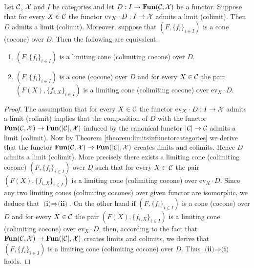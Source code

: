 \begin{corollary}\label{corollary:limitsaretakenpointwiseinfuncorcategories}
Let ${\mathcal C}$, ${\mathcal X}$ and $I$ be categories and let $D:I\rightarrow \mathbf{Fun}({\mathcal C},{\mathcal X})$ be a functor. Suppose that for every $X\in {\mathcal C}$ the functor $\mathrm{ev}_X\cdot D:I\rightarrow {\mathcal X}$ admits a limit (colimit). Then $D$ admits a limit (colimit). Moreover, suppose that $\left(F,\big\{f_i\big\}_{i\in I}\right)$ is a cone (cocone) over $D$. Then the following are equivalent.
\begin{enumerate}[label=\emph{\textbf{(\roman*)}}, leftmargin=1.5em]
\item $\left(F,\big\{f_i\big\}_{i\in I}\right)$ is a limiting cone (colimiting cocone) over $D$.
\item $\left(F,\big\{f_i\big\}_{i\in I}\right)$ is a cone (cocone) over $D$ and for every $X\in {\mathcal C}$ the pair $\left(F(X),\big\{f_{i,X}\big\}_{i\in I}\right)$ is a limiting cone (colimiting cocone) over $\mathrm{ev}_X\cdot D$.
\end{enumerate}
\end{corollary}
\begin{proof}
The assumption that for every $X\in {\mathcal C}$ the functor $\mathrm{ev}_X\cdot D:I\rightarrow {\mathcal X}$ admits a limit (colimit) implies that the composition of $D$ with the functor $\mathbf{Fun}({\mathcal C},{\mathcal X})\rightarrow \mathbf{Fun}(|{\mathcal C}|,{\mathcal X})$ induced by the canonical functor $|{\mathcal C}|\rightarrow {\mathcal C}$ admits a limit (colimit). Now by Theorem \ref{theorem:limitsinfunctorcategories} we derive that the functor $\mathbf{Fun}({\mathcal C},{\mathcal X})\rightarrow \mathbf{Fun}(|{\mathcal C}|,{\mathcal X})$ creates limits and colimits. Hence $D$ admits a limit (colimit). More precisely there exists a limiting cone (colimiting cocone) $\left(F,\big\{f_i\big\}_{i\in I}\right)$ over $D$ such that for every $X\in {\mathcal C}$ the pair $\left(F(X),\big\{f_{i,X}\big\}_{i\in I}\right)$ is a limiting cone (colimiting cocone) over $\mathrm{ev}_X\cdot D$. Since any two limiting cones (colimiting cocones) over given functor are isomorphic, we deduce that $\textbf{(i)} \Rightarrow \textbf{(ii)}$. On the other hand if $\left(F,\big\{f_i\big\}_{i\in I}\right)$ is a cone (cocone) over $D$ and for every $X\in {\mathcal C}$ the pair $\left(F(X),\big\{f_{i,X}\big\}_{i\in I}\right)$ is a limiting cone (colimiting cocone) over $\mathrm{ev}_X\cdot D$, then, according to the fact that $\mathbf{Fun}({\mathcal C},{\mathcal X})\rightarrow \mathbf{Fun}(|{\mathcal C}|,{\mathcal X})$ creates limits and colimits, we derive that $\left(F,\big\{f_i\big\}_{i\in I}\right)$ is a limiting cone (colimiting cocone) over $D$. Thus $\textbf{(ii)}\Rightarrow \textbf{(i)}$ holds.
\end{proof}


